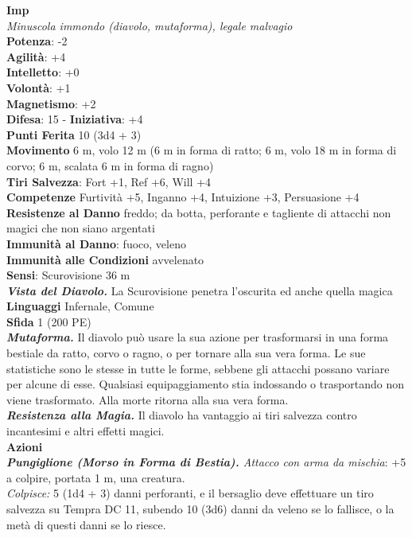 \begin{multicols}{2}
\medskip\textbf{Imp}\\
\emph{Minuscola immondo (diavolo, mutaforma), legale malvagio}\\
\textbf{Potenza}: -2\\
\textbf{Agilità}: +4\\
\textbf{Intelletto}: +0\\
\textbf{Volontà}: +1\\
\textbf{Magnetismo}: +2\\
\textbf{Difesa}: 15 - \textbf{Iniziativa}: +4\\
\textbf{Punti Ferita} 10 (3d4 + 3)\\
\textbf{Movimento} 6 m, volo 12 m (6 m in forma di ratto; 6 m, volo 18 m in forma di corvo; 6 m, scalata 6 m in forma di ragno)\\
\textbf{Tiri Salvezza}: Fort +1, Ref +6, Will +4\\
\textbf{Competenze} Furtività +5, Inganno +4, Intuizione +3, Persuasione +4\\
\textbf{Resistenze al Danno} freddo; da botta, perforante e tagliente di attacchi non magici che non siano argentati\\
\textbf{Immunità al Danno}: fuoco, veleno\\
\textbf{Immunità alle Condizioni} avvelenato\\
\textbf{Sensi}: Scurovisione 36 m\\
\emph{\textbf{Vista del Diavolo.}} La Scurovisione penetra l'oscurita ed anche quella magica\\
\textbf{Linguaggi} Infernale, Comune\\
\textbf{Sfida} 1 (200 PE)\smallskip\\
\emph{\textbf{Mutaforma.}} Il diavolo può usare la sua azione per trasformarsi in una forma bestiale da ratto, corvo o ragno, o per tornare alla sua vera forma. Le sue statistiche sono le stesse in tutte le forme, sebbene gli attacchi possano variare per alcune di esse. Qualsiasi equipaggiamento stia indossando o trasportando non viene trasformato. Alla morte ritorna alla sua vera forma. \\
\emph{\textbf{Resistenza alla Magia.}} Il diavolo ha vantaggio ai tiri
salvezza contro incantesimi e altri effetti magici.\\
\smallskip\textbf{Azioni}\\
\emph{\textbf{Pungiglione (Morso in Forma di Bestia).} Attacco con arma da mischia}: +5 a colpire, portata 1 m, una creatura.\\
\emph{Colpisce:} 5 (1d4 + 3) danni perforanti, e il bersaglio deve effettuare un tiro salvezza su Tempra DC 11, subendo 10 (3d6) danni da veleno se lo fallisce, o la metà di questi danni se lo riesce.\\

\end{multicols}
